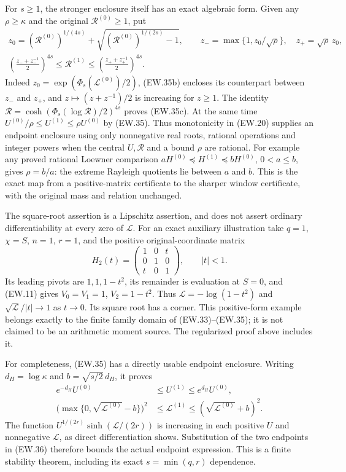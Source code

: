 \documentclass[11pt]{article}
\begin{document}
For $s\ge1$, the stronger enclosure itself has an exact algebraic form.
Given any $\rho\ge\kappa$ and the original $\mathscr R^{(0)}\ge1$,
put
\[
 \begin{gathered}
 z_0=(\mathscr R^{(0)})^{1/(4s)}
       +\sqrt{(\mathscr R^{(0)})^{1/(2s)}-1},\qquad
 z_-=\max\{1,z_0/\sqrt\rho\},\quad z_+=\sqrt\rho\,z_0,\\
 \boxed{\left(\frac{z_-+z_-^{-1}}2\right)^{4s}
       \le\mathscr R^{(1)}\le
       \left(\frac{z_++z_+^{-1}}2\right)^{4s}.}
 \end{gathered}                                               \tag{EW.35c}
\]
Indeed $z_0=\exp(\Phi_s(\mathscr L^{(0)})/2)$,
(EW.35b) encloses its counterpart between $z_-$ and $z_+$,
and $z\mapsto(z+z^{-1})/2$ is increasing for $z\ge1$.
The identity $\mathscr R=\cosh(\Phi_s(\log\mathscr R)/2)^{4s}$
proves (EW.35c). At the same time
$U^{(0)}/\rho\le U^{(1)}\le\rho U^{(0)}$ by (EW.35).
Thus monotonicity in (EW.20) supplies an endpoint enclosure using
only nonnegative real roots, rational operations and integer powers when
the central $U,\mathscr R$ and a bound $\rho$ are rational.
For example any proved rational Loewner comparison
$aH^{(0)}\preceq H^{(1)}\preceq bH^{(0)}$, $0<a\le b$,
gives $\rho=b/a$: the extreme Rayleigh quotients lie between
$a$ and $b$. This is the exact map from a positive-matrix
certificate to the sharper window certificate, with the original
mass and relation unchanged.

The square-root assertion is a Lipschitz assertion, and does not
assert ordinary differentiability at every zero of $\mathscr L$.
For an exact auxiliary illustration take $q=1$, $\chi=S$, $n=1$,
$r=1$, and the positive original-coordinate matrix
\[
 H_2(t)=\begin{pmatrix}1&0&t\\0&1&0\\t&0&1\end{pmatrix},
 \qquad |t|<1.
\]
Its leading pivots are $1,1,1-t^2$, its remainder is evaluation
at $S=0$, and (EW.11) gives $V_0=V_1=1$, $V_2=1-t^2$.
Thus $\mathscr L=-\log(1-t^2)$ and
$\sqrt{\mathscr L}/|t|\to1$ as $t\to0$. Its square root
has a corner. This positive-form example belongs exactly to the
finite family domain of (EW.33)--(EW.35); it is not claimed to be
an arithmetic moment source. The regularized proof above includes it.

For completeness, (EW.35) has a directly usable endpoint enclosure.
Writing $d_H=\log\kappa$ and
$b=\sqrt{s/2}\,d_H$, it proves
\[
 \begin{split}
 e^{-d_H}U^{(0)}&\le U^{(1)}\le e^{d_H}U^{(0)},\\
 \bigl(\max\{0,\sqrt{\mathscr L^{(0)}}-b\}\bigr)^2
 &\le\mathscr L^{(1)}
 \le(\sqrt{\mathscr L^{(0)}}+b)^2.
 \end{split}                                                   \tag{EW.36}
\]
The function $U^{1/(2r)}\sinh(\mathscr L/(2r))$ is increasing
in each positive $U$ and nonnegative $\mathscr L$, as direct
differentiation shows. Substitution of the two endpoints in (EW.36)
therefore bounds the actual endpoint expression. This is a finite
stability theorem, including its exact $s=\min(q,r)$ dependence.
\end{document}
